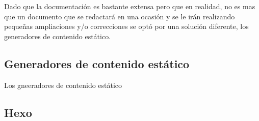 Dado que la documentación es bastante extensa pero que en realidad, no es mas que un documento 
que se redactará en una ocasión y se le irán realizando pequeñas ampliaciones y/o correcciones
se optó por una solución diferente, los generadores de contenido estático.

\subsection{Generadores de contenido estático}

Los gneeradores de contenido estático 

\subsection{Hexo}



